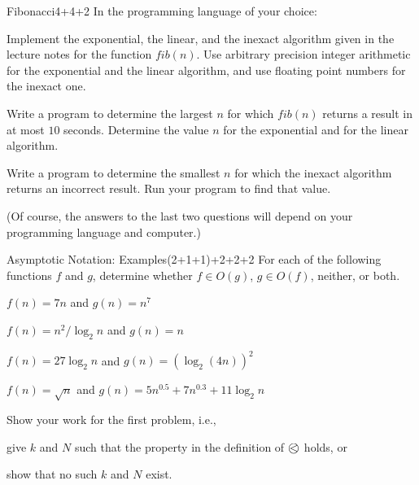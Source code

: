 \documentclass[a4paper]{article}
\begin{document}
\header

\begin{problem}{Fibonacci}{4+4+2}
In the programming language of your choice:

\begin{compactenum}
 \item Implement the exponential, the linear, and the inexact algorithm given in the lecture notes for the function $fib(n)$.
 Use arbitrary precision integer arithmetic for the exponential and the linear algorithm, and use floating point numbers for the inexact one.
 \item Write a program to determine the largest $n$ for which $fib(n)$ returns a result in at most $10$ seconds.
  Determine the value $n$ for the exponential and for the linear algorithm.
 \item Write a program to determine the smallest $n$ for which the inexact algorithm returns an incorrect result.
  Run your program to find that value.
\end{compactenum}

(Of course, the answers to the last two questions will depend on your programming language and computer.)
\end{problem}

\begin{problem}{Asymptotic Notation: Examples}{(2+1+1)+2+2+2}
For each of the following functions $f$ and $g$, determine whether $f\in O(g)$, $g\in O(f)$, neither, or both.

\begin{compactenum}
 \item $f(n)=7n$ and $g(n)=n^7$
 \item $f(n)=n^2/\log_2 n$ and $g(n)=n$
 \item $f(n)=27\log_2 n$ and $g(n)=(\log_2(4n))^2$
 \item $f(n)=\sqrt{n}$ and $g(n)=5n^{0.5}+7n^{0.3}+11\log_2 n$
\end{compactenum}

Show your work for the first problem, i.e.,
\begin{compactitem}
 \item give $k$ and $N$ such that the property in the definition of $\Oleq{}$ holds, or
 \item show that no such $k$ and $N$ exist.
\end{compactitem}
\end{problem}
\end{document}

